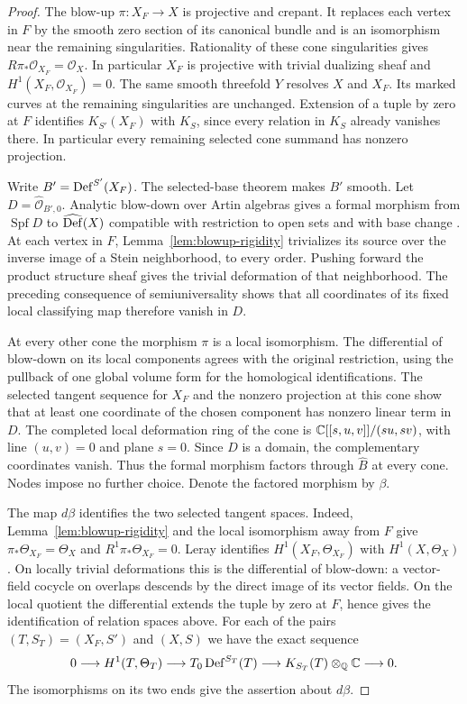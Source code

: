 \begin{proof}
The blow-up $\pi:X_F\to X$ is projective and crepant. It replaces each
vertex in $F$ by the smooth zero section of its canonical bundle and
is an isomorphism near the remaining singularities. Rationality of
these cone singularities gives $R\pi_*\mathcal O_{X_F}=\mathcal O_X$.
In particular $X_F$ is projective with trivial dualizing sheaf and
$H^1(X_F,\mathcal O_{X_F})=0$. The same smooth threefold $Y$ resolves
$X$ and $X_F$. Its marked curves at the remaining singularities are
unchanged. Extension of a tuple by zero at $F$ identifies
$K_{S'}(X_F)$ with $K_S$, since every relation in $K_S$ already
vanishes there. In particular every remaining selected cone summand
has nonzero projection.

Write $B'=\operatorname{Def}^{S'}(X_F)$. The selected-base theorem
\cite[Theorem~4.5]{W5} makes $B'$ smooth. Let
$D=\widehat{\mathcal O}_{B',0}$. Analytic blow-down over Artin
algebras gives a formal morphism from $\operatorname{Spf}D$ to
$\widehat{\operatorname{Def}}(X)$ compatible with restriction to open sets and with
base change \cite[Lemmas~4.2--4.3]{W5}. At each vertex in $F$,
Lemma~\ref{lem:blowup-rigidity} trivializes its source over the
inverse image of a Stein neighborhood, to every order. Pushing forward
the product structure sheaf gives the trivial deformation of that
neighborhood. The preceding consequence of semiuniversality shows
that all coordinates of its fixed local classifying map therefore
vanish in $D$.

At every other cone the morphism $\pi$ is a local isomorphism. The
differential of blow-down on its local components agrees with the
original restriction, using the pullback of one global volume form
for the homological identifications. The selected tangent sequence
\cite[Lemma~4.4]{W5} for $X_F$ and the nonzero projection at this cone
show that at least one coordinate of the chosen component has nonzero
linear term in $D$. The completed local deformation ring of the cone is
$\mathbb C[[s,u,v]]/(su,sv)$, with line $(u,v)=0$ and plane $s=0$.
Since $D$ is a domain, the complementary coordinates vanish. Thus the
formal morphism factors through $\widehat B$ at every cone. Nodes
impose no further choice. Denote the factored morphism by $\beta$.

The map $d\beta$ identifies the two selected tangent spaces. Indeed,
Lemma~\ref{lem:blowup-rigidity} and the local isomorphism away from $F$
give $\pi_*\Theta_{X_F}=\Theta_X$ and $R^1\pi_*\Theta_{X_F}=0$.
Leray identifies $H^1(X_F,\Theta_{X_F})$ with $H^1(X,\Theta_X)$.
On locally trivial deformations this is the differential of blow-down:
a vector-field cocycle on overlaps descends by the direct image of
its vector fields. On the local quotient the differential extends the
tuple by zero at $F$, hence gives the identification of relation
spaces above. For each of the pairs $(T,S_T)=(X_F,S')$ and $(X,S)$
we have the exact sequence
\[
 0\longrightarrow H^1(T,\Theta_T)
 \longrightarrow T_0\operatorname{Def}^{S_T}(T)
 \longrightarrow K_{S_T}(T)\otimes_{\mathbb Q}\mathbb C\longrightarrow0.
\]
The isomorphisms on its two ends give the assertion about $d\beta$.


\end{proof}
